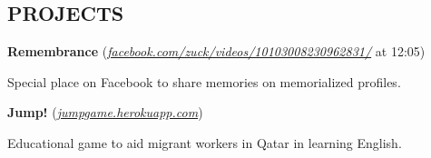 \documentclass[margin, 11pt]{res} %
\begin{document}
\begin{resume}
\section{PROJECTS}

{\bf Remembrance} {\small (\href{https://www.facebook.com/zuck/videos/10103008230962831/}{\sl facebook.com/zuck/videos/10103008230962831/} at 12:05)}

\begin{itemize} \itemsep -2pt
{\small \item Special place on Facebook to share memories on memorialized profiles.}
\end{itemize}

\vspace{3pt}

{\bf Jump!} {\small (\href{http://jumpgame.herokuapp.com/}{\sl jumpgame.herokuapp.com}) }

\begin{itemize} \itemsep -2pt
{\small \item Educational game to aid migrant workers in Qatar in learning English.}
\end{itemize}









\end{resume}
\end{document}
